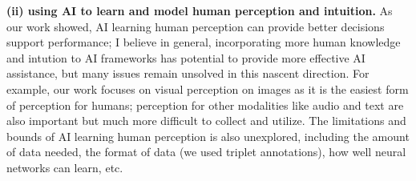 \textbf{(ii) using AI to learn and model human perception and intuition.} 
As our work showed, AI learning human perception can provide better decisions support performance; I believe in general, incorporating more human knowledge and intution to AI frameworks has potential to provide more effective AI assistance, but many issues remain unsolved in this nascent direction. 
For example, our work focuses on visual perception on images as it is the easiest form of perception for humans; perception for other modalities like audio and text are also important but much more difficult to collect and utilize. The limitations and bounds of AI learning human perception is also unexplored, including the amount of data needed, the format of data (we used triplet annotations), how well neural networks can learn, etc.
\\














